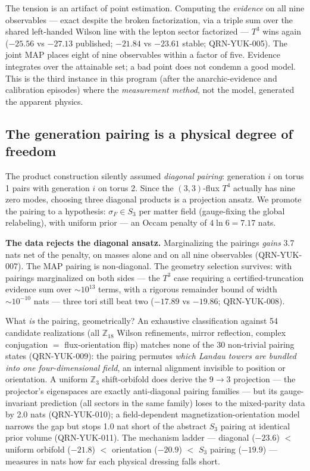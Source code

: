 \documentclass[aps,prd,preprint,nofootinbib]{revtex4-2}
\begin{document}
The tension is an artifact of point estimation. Computing the \emph{evidence}
on all nine observables --- exact despite the broken factorization, via a
triple sum over the shared left-handed Wilson line with the lepton sector
factorized --- $T^3$ wins again ($-25.56$ vs $-27.13$ published; $-21.84$ vs
$-23.61$ stable; QRN-YUK-005). The joint MAP places eight of nine observables
within a factor of five. Evidence integrates over the attainable set; a bad
point does not condemn a good model. This is the third instance in this program
(after the anarchic-evidence and calibration episodes) where the
\emph{measurement method}, not the model, generated the apparent physics.

\subsection{The generation pairing is a physical degree of freedom}
\label{sec:pairing}

The product construction silently assumed \emph{diagonal pairing}: generation
$i$ on torus 1 pairs with generation $i$ on torus 2. Since the $(3,3)$-flux
$T^4$ actually has nine zero modes, choosing three diagonal products is a
projection ansatz. We promote the pairing to a hypothesis: $\sigma_F\in S_3$
per matter field (gauge-fixing the global relabeling), with uniform prior ---
an Occam penalty of $4\ln 6=7.17$ nats.

\textbf{The data rejects the diagonal ansatz.} Marginalizing the pairings
\emph{gains} 3.7 nats net of the penalty, on masses alone and on all nine
observables (QRN-YUK-007). The MAP pairing is non-diagonal. The geometry
selection survives: with pairings marginalized on both sides --- the $T^3$ case
requiring a certified-truncation evidence sum over $\sim 10^{13}$ terms, with a
rigorous remainder bound of width $\sim 10^{-10}$ nats --- three tori still
beat two ($-17.89$ vs $-19.86$; QRN-YUK-008).

What \emph{is} the pairing, geometrically? An exhaustive classification against
54 candidate realizations (all $\mathbb{Z}_{18}$ Wilson refinements, mirror
reflection, complex conjugation $=$ flux-orientation flip) matches none of the
30 non-trivial pairing states (QRN-YUK-009): the pairing permutes \emph{which
Landau towers are bundled into one four-dimensional field}, an internal
alignment invisible to position or orientation. A uniform $\mathbb{Z}_3$
shift-orbifold does derive the $9\to 3$ projection --- the projector's
eigenspaces are exactly anti-diagonal pairing families --- but its
gauge-invariant prediction (all sectors in the same family) loses to the
mixed-parity data by 2.0 nats (QRN-YUK-010); a field-dependent
magnetization-orientation model narrows the gap but stops 1.0 nat short of the
abstract $S_3$ pairing at identical prior volume (QRN-YUK-011). The mechanism
ladder --- diagonal ($-23.6$) $<$ uniform orbifold ($-21.8$) $<$ orientation
($-20.9$) $<$ $S_3$ pairing ($-19.9$) --- measures in nats how far each
physical dressing falls short.
\end{document}
